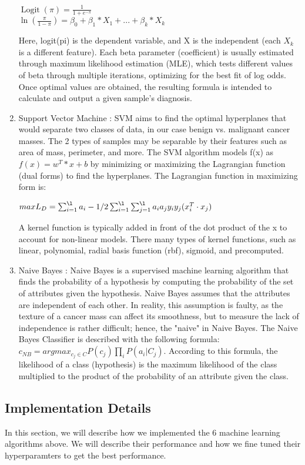 \documentclass[conference]{IEEEtran}
\begin{document}
\begin{enumerate}
\begin{center}
    $\operatorname{Logit}(\pi) = \frac{1}{1+e^{-\pi}}$\\
    $\operatorname{ln}(\frac{\pi}{1-\pi}) = \beta_0 + \beta_1*X_1 + ... + \beta_k*X_k$
\end{center}
Here, logit(pi) is the dependent variable, and X is the independent (each $X_k$ is a different feature). Each beta parameter (coefficient) is usually estimated through maximum likelihood estimation (MLE), which tests different values of beta through multiple iterations, optimizing for the best fit of log odds. Once optimal values are obtained, the resulting formula is intended to calculate and output a given sample's diagnosis.
\item Support Vector Machine : SVM aims to find the optimal hyperplanes that would separate two classes of data, in our case benign vs. malignant cancer masses. The 2 types of samples may be separable by their features such as area of mass, perimeter, and more. The SVM algorithm models f(x) as \(f(x) = w^T*x + b\) by minimizing or maximizing the Lagrangian function (dual forms) to find the hyperplanes. The Lagrangian function in maximizing form is:
\begin{center}
    \(max L_D = \sum_{i=1}^{\l}a_i - 1/2\sum_{i=1}^{\l}\sum_{j=1}^{\l}a_i a_j y_i y_j(x_i^T \cdot x_j)\)
\end{center}
A kernel function is typically added in front of the dot product of the x to account for non-linear models. There many types of kernel functions, such as linear, polynomial, radial basis function (rbf), sigmoid, and precomputed. 
\item Naive Bayes : Naive Bayes is a supervised machine learning algorithm that finds the probability of a hypothesis by computing the probability of the set of attributes given the hypothesis. Naive Bayes assumes that the attributes are independent of each other. In reality, this assumption is faulty, as the texture of a cancer mass can affect its smoothness, but to measure the lack of independence is rather difficult; hence, the "naive" in Naive Bayes. The Naive Bayes Classifier is described with the following formula: $c_{NB} = argmax_{c_{j} \in C} P(c_{j}) \prod_i P(a_i |C_j)$.  According to this formula, the likelihood of a class (hypothesis) is the maximum likelihood of the class multiplied to the product of the probability of an attribute given the class.
\end{enumerate}

\subsection{Implementation Details}
In this section, we will describe how we implemented the 6 machine learning algorithms above. We will describe their performance and how we fine tuned their hyperparamters to get the best performance. 
\end{document}

